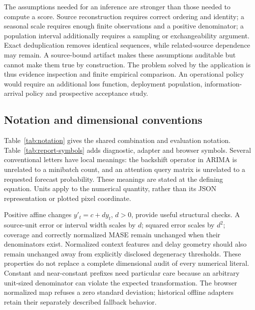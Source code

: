 The assumptions needed for an inference are stronger than those needed to compute a score. Source reconstruction requires correct ordering and identity; a seasonal scale requires enough finite observations and a positive denominator; a population interval additionally requires a sampling or exchangeability argument. Exact deduplication removes identical sequences, while related-source dependence may remain. A source-bound artifact makes these assumptions auditable but cannot make them true by construction. The problem solved by the application is thus evidence inspection and finite empirical comparison. An operational policy would require an additional loss function, deployment population, information-arrival policy and prospective acceptance study.

\subsection{Notation and dimensional conventions}
Table~\ref{tab:notation} gives the shared combination and evaluation notation. Table~\ref{tab:report-symbols} adds diagnostic, adapter and browser symbols. Several conventional letters have local meanings: the backshift operator in ARIMA is unrelated to a minibatch count, and an attention query matrix is unrelated to a requested forecast probability. These meanings are stated at the defining equation. Units apply to the numerical quantity, rather than its JSON representation or plotted pixel coordinate.

Positive affine changes $y'_t=c+d y_t$, $d>0$, provide useful structural checks. A source-unit error or interval width scales by $d$; squared error scales by $d^2$; coverage and correctly normalized MASE remain unchanged when their denominators exist. Normalized context features and delay geometry should also remain unchanged away from explicitly disclosed degeneracy thresholds. These properties do not replace a complete dimensional audit of every numerical literal. Constant and near-constant prefixes need particular care because an arbitrary unit-sized denominator can violate the expected transformation. The browser normalized map refuses a zero standard deviation; historical offline adapters retain their separately described fallback behavior.

